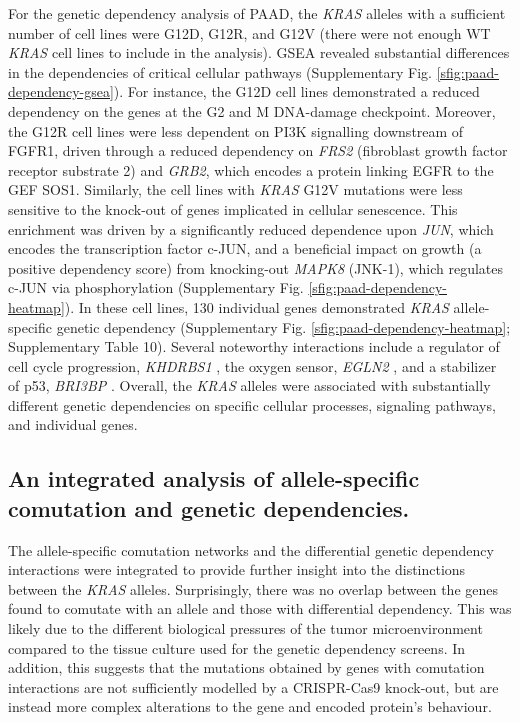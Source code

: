 \documentclass[english, 10pt, letterpaper]{article}
\newcommand{\KRAS}{\emph{KRAS}}
\begin{document}
For the genetic dependency analysis of PAAD, the \KRAS{} alleles with a sufficient number of cell lines were G12D, G12R, and G12V (there were not enough WT \KRAS{} cell lines to include in the analysis).
GSEA revealed substantial differences in the dependencies of critical cellular pathways (Supplementary Fig. \ref{sfig:paad-dependency-gsea}).
For instance, the G12D cell lines demonstrated a reduced dependency on the genes at the G2 and M DNA-damage checkpoint.
Moreover, the G12R cell lines were less dependent on PI3K signalling downstream of FGFR1, driven through a reduced dependency on \emph{FRS2} (fibroblast growth factor receptor substrate 2) and \emph{GRB2}, which encodes a protein linking EGFR to the GEF SOS1.
Similarly, the cell lines with \KRAS{} G12V mutations were less sensitive to the knock-out of genes implicated in cellular senescence.
This enrichment was driven by a significantly reduced dependence upon \emph{JUN}, which encodes the transcription factor c-JUN, and a beneficial impact on growth (a positive dependency score) from knocking-out \emph{MAPK8} (JNK-1), which regulates c-JUN via phosphorylation (Supplementary Fig. \ref{sfig:paad-dependency-heatmap}).
In these cell lines, 130 individual genes demonstrated \KRAS{} allele-specific genetic dependency (Supplementary Fig. \ref{sfig:paad-dependency-heatmap}; Supplementary Table 10).
Several noteworthy interactions include a regulator of cell cycle progression, \emph{KHDRBS1} \cite{Barlat1997ADomain}, the oxygen sensor, \emph{EGLN2} \cite{Ivan2017TheFeedbacks}, and a stabilizer of p53, \emph{BRI3BP} \cite{Ha2008HCCRBP-1Stabilization}.
Overall, the \KRAS{} alleles were associated with substantially different genetic dependencies on specific cellular processes, signaling pathways, and individual genes.


\subsection*{An integrated analysis of allele-specific comutation and genetic dependencies.}

The allele-specific comutation networks and the differential genetic dependency interactions were integrated to provide further insight into the distinctions between the \KRAS{} alleles.
Surprisingly, there was no overlap between the genes found to comutate with an allele and those with differential dependency.
This was likely due to the different biological pressures of the tumor microenvironment compared to the tissue culture used for the genetic dependency screens.
In addition, this suggests that the mutations obtained by genes with comutation interactions are not sufficiently modelled by a CRISPR-Cas9 knock-out, but are instead more complex alterations to the gene and encoded protein's behaviour.
\end{document}
